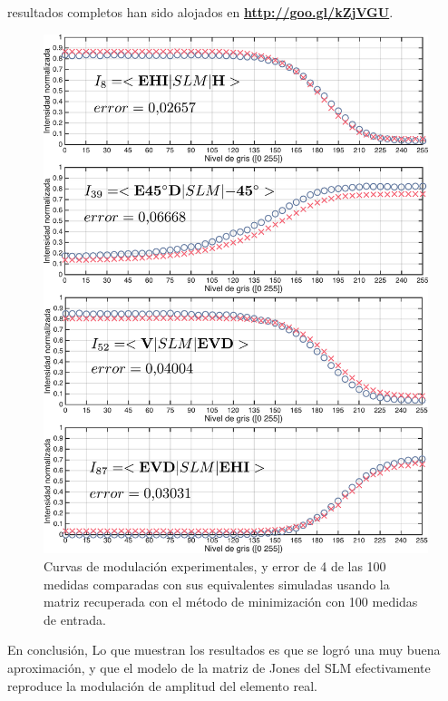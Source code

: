 resultados completos han sido 
alojados en \href{http://goo.gl/kZjVGU}{\textbf{http://goo.gl/kZjVGU}}.
\begin{figure}[h!]
\centering
\includegraphics[scale=.5]{some_100_caracterization_results.pdf}
\caption[Curvas de modulación experimentales comparadas con las
simuladas usando el modelo obtenido con el método de minimización de 100
medidas]{Curvas de modulación
  experimentales, y error de 4 de las 100 medidas comparadas con sus
  equivalentes simuladas usando la matriz recuperada con el método de
  minimización con 100 medidas de entrada.}
\label{fig:100m_caracterization_results}
\end{figure}
En conclusión, Lo que muestran los resultados es que se logró una muy buena aproximación, y que el modelo de la matriz de Jones del SLM efectivamente
reproduce la modulación de amplitud del elemento real. 

